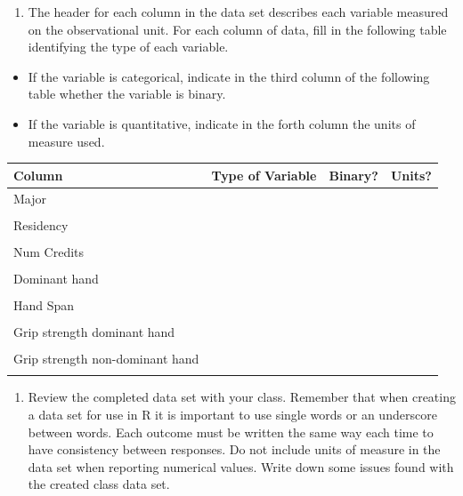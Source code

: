 \documentclass[
]{report}
\providecommand{\tightlist}{%
  \setlength{\itemsep}{0pt}\setlength{\parskip}{0pt}}
\begin{document}
\vspace{0.3in}

\begin{enumerate}
\def\labelenumi{\arabic{enumi}.}
\setcounter{enumi}{2}
\tightlist
\item
  The header for each column in the data set describes each variable measured on the observational unit. For each column of data, fill in the following table identifying the type of each variable.
\end{enumerate}

\begin{itemize}
\item
  If the variable is categorical, indicate in the third column of the following table whether the variable is binary.
\item
  If the variable is quantitative, indicate in the forth column the units of measure used.
\end{itemize}

\begin{center}
\begin{tabular}{|l|p{1.5in}|p{0.5in}|p{0.5in}|} \hline
Column & Type of Variable & Binary? & Units? \\ \hline
Major & & &\\
& & & \\ \hline
Residency & & & \\
& & & \\ \hline
Num Credits & & & \\
& & & \\ \hline
Dominant hand & & & \\
& & & \\ \hline
Hand Span & & & \\
& & & \\ \hline
Grip strength dominant hand & & & \\
& & & \\ \hline
Grip strength non-dominant hand & & & \\
& & & \\ \hline
\end{tabular}
\end{center}

\begin{enumerate}
\def\labelenumi{\arabic{enumi}.}
\setcounter{enumi}{3}
\tightlist
\item
  Review the completed data set with your class. Remember that when creating a data set for use in R it is important to use single words or an underscore between words. Each outcome must be written the same way each time to have consistency between responses. Do not include units of measure in the data set when reporting numerical values. Write down some issues found with the created class data set.
\end{enumerate}
\end{document}
